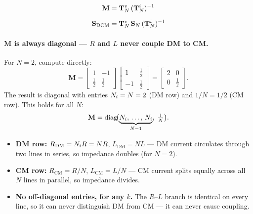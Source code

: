 \begin{eqnbox}
\begin{align}
    \mathbf{M}
        &= \mathbf{T}^{v}_{N}\,(\mathbf{T}^{i}_{N})^{-1}
        \label{eq:Mdef} \\[6pt]
    \mathbf{S}_{\mathrm{DCM}}
        &= \mathbf{T}^{v}_{N}\,\mathbf{S}_N\,(\mathbf{T}^{i}_{N})^{-1}
        \label{eq:Sdcm_def}
\end{align}
\end{eqnbox}

\paragraph{$\mathbf{M}$ is always diagonal — $R$ and $L$ never couple DM to CM.}

For $N = 2$, compute directly:
\[
    \mathbf{M}
    = \begin{bmatrix}1 & -1 \\[3pt] \tfrac{1}{2} & \tfrac{1}{2}\end{bmatrix}
      \begin{bmatrix}1 & \tfrac{1}{2} \\[3pt] -1 & \tfrac{1}{2}\end{bmatrix}
    = \begin{bmatrix}2 & 0 \\[3pt] 0 & \tfrac{1}{2}\end{bmatrix}.
\]
The result is diagonal with entries $N_{i} = N = 2$ (DM row) and $1/N = 1/2$
(CM row).  This holds for all $N$:
\[
    \mathbf{M}
    = \operatorname{diag}\!\bigl(\underbrace{N_{i},\,\ldots,\,N_{i}}_{N-1},\;
      \tfrac{1}{N}\bigr).
\]

\begin{circuitbox}
\begin{itemize}
    \item \textbf{DM row:} $R_{\mathrm{DM}} = N_{i} R = NR$,\;
          $L_{\mathrm{DM}} = NL$ — DM current circulates through two
          lines in series, so impedance doubles (for $N = 2$). \checkmark
    \item \textbf{CM row:} $R_{\mathrm{CM}} = R/N$,\;
          $L_{\mathrm{CM}} = L/N$ — CM current splits equally across
          all $N$ lines in parallel, so impedance divides. \checkmark
    \item \textbf{No off-diagonal entries, for any $k$.}
          The $R$--$L$ branch is identical on every line, so it can
          never distinguish DM from CM — it can never cause coupling.
\end{itemize}
\end{circuitbox}

